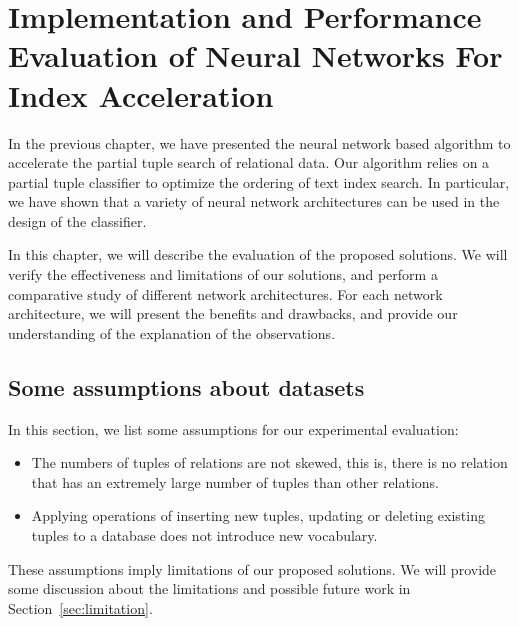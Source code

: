 \chapter{Implementation and Performance Evaluation of Neural Networks For Index Acceleration}
\label{ch:implementation-evaluation}

In the previous chapter, we have presented the neural network based algorithm to accelerate the partial tuple search of relational data.  Our algorithm relies on a partial tuple classifier to optimize the ordering of text index search.  In particular, we have shown that a variety of neural network architectures can be used in the design of the classifier.

In this chapter, we will describe the evaluation of the proposed solutions.  We will verify the effectiveness and limitations of our solutions, and perform a comparative study of different network architectures.  For each network architecture, we will present the benefits and drawbacks, and provide our understanding of the explanation of the observations.

\section{Some assumptions about datasets}
\label{sec:assumption}
In this section, we list some assumptions for our experimental evaluation:
\begin{itemize}
	\item The numbers of tuples of relations are not skewed, this is, there is no relation that has an extremely large number of tuples than other relations.
	\item Applying operations of inserting new tuples, updating or deleting existing tuples to a database does not introduce new vocabulary.
\end{itemize}

These assumptions imply limitations of our proposed solutions. We will provide some discussion about the limitations and possible future work in Section~\ref{sec:limitation}.

